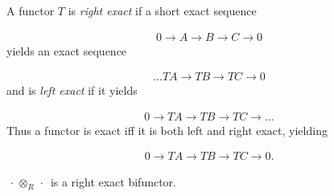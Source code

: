 
\begin{definition}

\end{definition}


\begin{definition}

\end{definition}


\begin{definition}

A functor \(T\) is \emph{right exact} if a short exact sequence

\begin{align*}0 \to A \to B \to C \to 0
\end{align*}
yields an exact sequence

\begin{align*}\ldots TA \to TB \to TC \to 0
\end{align*}
and is \emph{left exact} if it yields

\begin{align*}0 \to TA \to TB \to TC \to \ldots
\end{align*}
Thus a functor is exact iff it is both left and right exact, yielding

\begin{align*}0 \to TA \to TB \to TC \to 0
.\end{align*}

\end{definition}

\begin{example}

\({\,\cdot\,}\otimes_{R} {\,\cdot\,}\) is a right exact bifunctor.

\end{example}

\begin{definition}

\end{definition}


\begin{definition}[Excision]

\end{definition}

